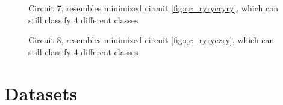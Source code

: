 \begin{figure}[!ht]
    \centering
    \caption{Circuit 7, resembles minimized circuit \ref{fig:qc_ryrycryry}, which can still classify 4 different classes}
    \label{fig:qc_ryryrycry_2qbit}
\end{figure}

\begin{figure}[!ht]
    \centering
    \caption{Circuit 8, resembles minimized circuit \ref{fig:qc_ryryczry}, which can still classify 4 different classes}
    \label{fig:qc_ryryczry_2qbit}
\end{figure}


\section{Datasets}
\label{chapter:datasets}

